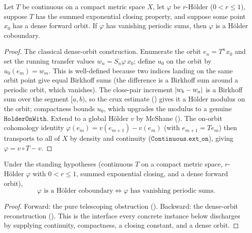 \begin{theorem}\label{thm:livsic-existence}
  \leanok
  Let \(T\) be continuous on a compact metric space \(X\), let \(\varphi\) be \(r\)-Hölder
  (\(0 < r\le 1\)), suppose \(T\) has the summed exponential closing property, and suppose some
  point \(x_0\) has a dense forward orbit. If \(\varphi\) has vanishing periodic sums, then
  \(\varphi\) is a Hölder coboundary.
\end{theorem}
\begin{proof}\leanok
  The classical dense-orbit construction. Enumerate the orbit \(e_n = T^n x_0\) and set the running
  transfer values \(w_n = S_n\varphi\,x_0\); define \(u_0\) on the orbit by \(u_0(e_m) = w_m\). This
  is well-defined because two indices landing on the same orbit point give equal Birkhoff sums (the
  difference is a Birkhoff sum around a periodic orbit, which vanishes). The close-pair increment
  \(\left\lvert w_b - w_a \right\rvert\) is a Birkhoff sum over the segment \([a,b)\), so the crux estimate
  () gives it a Hölder modulus on the orbit; compactness bounds \(u_0\), which
  upgrades the modulus to a genuine \(\texttt{HolderOnWith}\). Extend to a global Hölder \(v\) by
  McShane (). The on-orbit cohomology identity \(\varphi(e_m) = v(e_{m+1}) -
  v(e_m)\) (with \(e_{m+1} = T e_m\)) then transports to all of \(X\) by density and continuity
  (\(\texttt{Continuous.ext\_on}\)), giving \(\varphi = v\circ T - v\).
\end{proof}

\begin{theorem}\label{thm:livsic-iff}
  \leanok
  Under the standing hypotheses (continuous \(T\) on a compact metric space, \(r\)-Hölder
  \(\varphi\) with \(0 < r\le 1\), summed exponential closing, and a dense forward orbit),
  \[
    \varphi \text{ is a Hölder coboundary} \iff \varphi \text{ has vanishing periodic sums}.
  \]
\end{theorem}
\begin{proof}\leanok
  Forward: the pure telescoping obstruction (). Backward: the dense-orbit
  reconstruction (). This is the interface every concrete instance below
  discharges by supplying continuity, compactness, a closing constant, and a dense orbit.
\end{proof}

